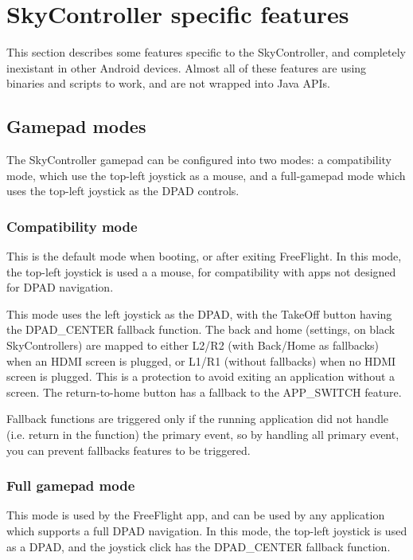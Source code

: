 \section{SkyController specific features}

This section describes some features specific to the SkyController, and completely inexistant in other Android devices. Almost all of these features are using binaries and scripts to work, and are not wrapped into Java APIs.

\subsection{Gamepad modes}

The SkyController gamepad can be configured into two modes: a compatibility mode, which use the top-left joystick as a mouse, and a full-gamepad mode which uses the top-left joystick as the DPAD controls.

\subsubsection{Compatibility mode}

This is the default mode when booting, or after exiting FreeFlight. In this mode, the top-left joystick is used a a mouse, for compatibility with apps not designed for DPAD navigation.

This mode uses the left joystick as the DPAD, with the TakeOff button having the DPAD\_CENTER fallback function. The back and home (settings, on black SkyControllers) are mapped to either L2/R2 (with Back/Home as fallbacks) when an HDMI screen is plugged, or L1/R1 (without fallbacks) when no HDMI screen is plugged. This is a protection to avoid exiting an application without a screen. The return-to-home button has a fallback to the APP\_SWITCH feature.

Fallback functions are triggered only if the running application did not handle (i.e. return  in the  function) the primary event, so by handling all primary event, you can prevent fallbacks features to be triggered.

\subsubsection{Full gamepad mode}

This mode is used by the FreeFlight app, and can be used by any application which supports a full DPAD navigation. In this mode, the top-left joystick is used as a DPAD, and the joystick click has the DPAD\_CENTER fallback function.

